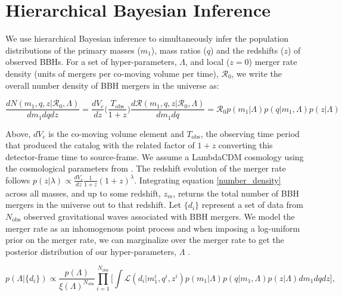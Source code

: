 \documentclass[twocolumn, linenumber]{aastex63}
\begin{document}
\appendix
\section{Hierarchical Bayesian Inference} \label{sec:hierarchical_inference}

We use hierarchical Bayesian inference to simultaneously infer the population distributions of the primary masses ($m_1$), mass ratios 
($q$) and the redshifts ($z$) of observed BBHs. For a set of hyper-parameters, $\Lambda$, and local ($z=0$) merger rate density (units of 
mergers per co-moving volume per time), $\mathcal{R}_0$, we write the overall number density of BBH mergers in the universe as: 

\begin{equation} \label{number_density}
     \frac{dN(m_1, q, z | \mathcal{R}_0, \Lambda)}{dm_1dqdz} = \frac{dV_c}{dz}\bigg(\frac{T_\mathrm{obs}}{1+z}\bigg) \frac{d\mathcal{R}(m_1, q, z | \mathcal{R}_0, \Lambda)}{dm_1dq} = \mathcal{R}_0 p(m_1 | \Lambda) p(q | m_1, \Lambda) p(z | \Lambda)
\end{equation}

\noindent
Above, $dV_c$ is the co-moving volume element \citep{hogg_cosmo} and $T_\mathrm{obs}$, the observing time period that produced the 
catalog with the related factor of $1+z$ converting this detector-frame time to source-frame. We assume a LambdaCDM cosmology using 
the cosmological parameters from \citet{Planck2015}. The redshift evolution of the merger rate follows 
$p(z|\lambda) \propto \frac{dV_c}{dz}\frac{1}{1+z}(1+z)^\lambda$. Integrating equation \ref{number_density} across all masses, 
and up to some redshift, $z_m$, returns the total number of BBH mergers in the universe out to that redshift. Let $\{d_i\}$ represent a 
set of data from $N_\mathrm{obs}$ observed gravitational waves associated with BBH mergers. We model the merger rate as an inhomogenous 
point process and when imposing a log-uniform prior on the merger rate, we can marginalize over the merger rate to get the posterior 
distribution of our hyper-parameters, $\Lambda$ \citep{Mandel_2019, Vitale_2021}.

\begin{equation} \label{posterior}
    p\left(\Lambda | \{d_i\} \right) \propto \frac{p(\Lambda)}{\xi(\Lambda)^{N_\mathrm{obs}}} \prod_{i=1}^{N_\mathrm{obs}} \Bigg[ \int \mathcal{L}\left(d_i | m_1^i, q^i, z^i \right) p(m_1 | \Lambda) p(q | m_1, \Lambda) p(z | \Lambda) dm_1 dq dz \Bigg],
\end{equation}
\end{document}
